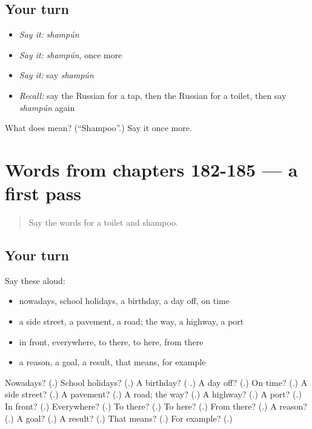 \subsection*{Your turn}
\begin{itemize}
\raggedright
  \item \emph{Say it:} \emph{shampún}
  \item \emph{Say it:} \emph{shampún}, once more
  \item \emph{Say it:} say \emph{shampún}
  \item \emph{Recall:} say the Russian for a tap, then the Russian for a toilet, then say \emph{shampún} again
\end{itemize}

\begin{tcolorbox}[breakable,colback=teal!4,colframe=teal!35!black,title={Before you move on}]
What does  mean? (\textquotedblleft{}Shampoo\textquotedblright{}.) Say it once more.
\end{tcolorbox}
\section[(dialogue)]{Words from chapters 182-185 — a first pass}

\label{lesson:RU-R190-first-pass-words-from-chapters-182-185}



\begin{quote}
Say the words for a toilet and shampoo.
\end{quote}

\subsection*{Your turn}
Say these aloud:

\begin{itemize}
\raggedright
  \item nowadays, school holidays, a birthday, a day off, on time
  \item a side street, a pavement, a road; the way, a highway, a port
  \item in front, everywhere, to there, to here, from there
  \item a reason, a goal, a result, that means, for example
\end{itemize}

\begin{tcolorbox}[breakable,colback=teal!4,colframe=teal!35!black,title={Before you move on}]
Nowadays? (\textbf{}.) School holidays? (\textbf{}.) A birthday? (\textbf{ }.) A day off? (\textbf{}.) On time? (\textbf{}.) A side street? (\textbf{}.) A pavement? (\textbf{}.) A road; the way? (\textbf{}.) A highway? (\textbf{}.) A port? (\textbf{}.) In front? (\textbf{}.) Everywhere? (\textbf{}.) To there? (\textbf{}.) To here? (\textbf{}.) From there? (\textbf{}.) A reason? (\textbf{}.) A goal? (\textbf{}.) A result? (\textbf{}.) That means? (\textbf{}.) For example? (\textbf{}.)
\end{tcolorbox}
